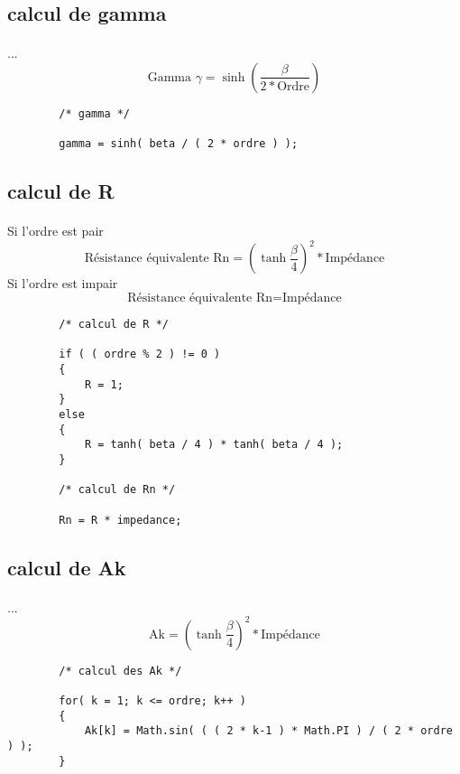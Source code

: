 \documentclass[a4paper,11pt]{article}
\begin{document}
\subsection{calcul de gamma}
    \paragraph{}
    ...\[ \mbox{Gamma } \gamma = \sinh( \frac{ \beta }{ 2 * \mbox{Ordre} } ) \]
    \begin{lstlisting}
        /* gamma */

        gamma = sinh( beta / ( 2 * ordre ) );

    \end{lstlisting}

\subsection{calcul de R}
    \paragraph{}
    Si l'ordre est pair \[ \mbox{Résistance équivalente Rn} = ( \tanh{ \frac{ \beta }{ 4 } } ) ^2 * \mbox{Impédance} \]
    Si l'ordre est impair \[ \mbox{Résistance équivalente Rn} = \mbox{Impédance} \]
    \begin{lstlisting}
        /* calcul de R */

        if ( ( ordre % 2 ) != 0 )
        {
            R = 1;
        }
        else
        {
            R = tanh( beta / 4 ) * tanh( beta / 4 );
        }

        /* calcul de Rn */

        Rn = R * impedance;

    \end{lstlisting}

\subsection{calcul de Ak }
    \paragraph{}
    ... \[ \mbox{Ak} = ( \tanh{ \frac{ \beta }{ 4 } } ) ^2 * \mbox{Impédance} \]
    \begin{lstlisting}
        /* calcul des Ak */

        for( k = 1; k <= ordre; k++ )
        {
            Ak[k] = Math.sin( ( ( 2 * k-1 ) * Math.PI ) / ( 2 * ordre ) );
        }

    \end{lstlisting}
\end{document}
